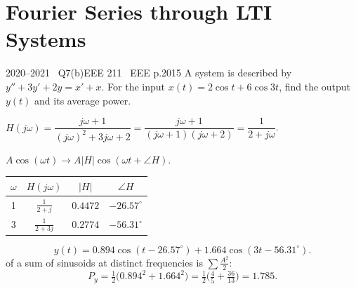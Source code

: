 \renewcommand{\teacherTag}{ANIK SIR \textbullet\ LECTURES 5--7}
\chapter{Fourier Series through LTI Systems}


\begin{qcard}{2020--2021 \textbullet\ Q7(b)}{EEE 211 \textbullet\ EEE p.20}{15}
A system is described by $y''+3y'+2y=x'+x$. For the input $x(t)=2\cos t+6\cos3t$, find the output $y(t)$ and its average power.
\end{qcard}
\begin{solution}
 $H(j\omega)=\dfrac{j\omega+1}{(j\omega)^2+3j\omega+2}=\dfrac{j\omega+1}{(j\omega+1)(j\omega+2)}=\dfrac1{2+j\omega}$.

 $A\cos(\omega t)\to A|H|\cos(\omega t+\angle H)$.
\begin{center}\small\begin{tabular}{@{}c|ccc@{}}$\omega$&$H(j\omega)$&$|H|$&$\angle H$\\\hline1&$\frac1{2+j}$&$0.4472$&$-26.57^\circ$\\3&$\frac1{2+3j}$&$0.2774$&$-56.31^\circ$\end{tabular}\end{center}
\[y(t)=0.894\cos(t-26.57^\circ)+1.664\cos(3t-56.31^\circ).\]
 of a sum of sinusoids at distinct frequencies is $\sum\frac{A^2}2$:
\[P_y=\tfrac12\big(0.894^2+1.664^2\big)=\tfrac12\Big(\tfrac45+\tfrac{36}{13}\Big)=1.785 .\]
\end{solution}

